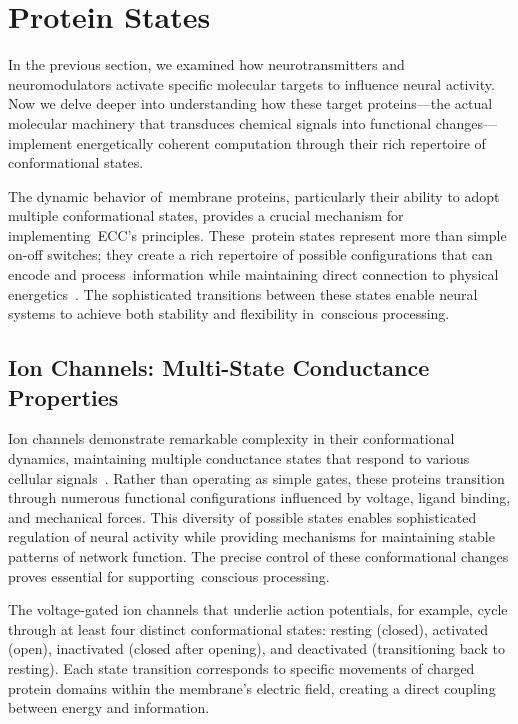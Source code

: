 \section{Protein States~~}

In the previous section, we examined how neurotransmitters and neuromodulators activate specific molecular targets to influence neural activity. Now we delve deeper into understanding how these target proteins—the actual molecular machinery that transduces chemical signals into functional changes—implement energetically coherent computation through their rich repertoire of conformational states.

The dynamic behavior of~membrane proteins, particularly their ability to adopt multiple conformational states, provides a crucial mechanism for implementing~ECC's principles. These~protein states represent more than simple on-off switches; they create a rich repertoire of possible configurations that can encode and process~information while maintaining direct connection to physical energetics~\cite{Balchin2016, Frauenfelder2009}. The sophisticated transitions between these states enable neural systems to achieve both stability and flexibility in~conscious processing.

\subsection*{Ion Channels: Multi-State Conductance Properties~}

Ion channels demonstrate remarkable complexity in their conformational dynamics, maintaining multiple conductance states that respond to various cellular signals~\cite{Henzler-Wildman2007, Bezanilla2002}. Rather than operating as simple gates, these proteins transition through numerous functional configurations influenced by voltage, ligand binding, and mechanical forces. This diversity of possible states enables sophisticated regulation of neural activity while providing mechanisms for maintaining stable patterns of network function. The precise control of these conformational changes proves essential for supporting~conscious processing.

The voltage-gated ion channels that underlie action potentials, for example, cycle through at least four distinct conformational states: resting (closed), activated (open), inactivated (closed after opening), and deactivated (transitioning back to resting). Each state transition corresponds to specific movements of charged protein domains within the membrane's electric field, creating a direct coupling between energy and information.

